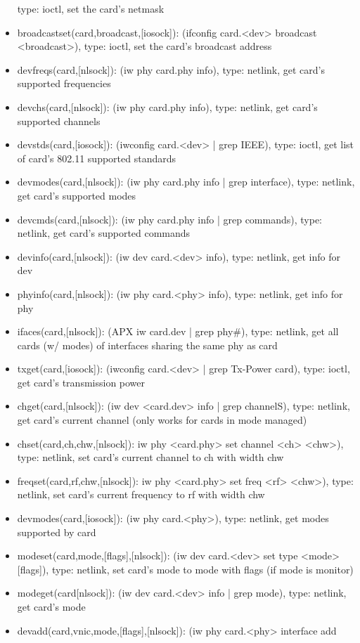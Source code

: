 \documentclass[11pt]{article}
\begin{document}
\begin{appendices}
\begin{itemize}
type: ioctl, set the card's netmask
\item broadcastset(card,broadcast,[iosock]): (ifconfig card.<dev> broadcast 
<broadcast>), type: ioctl, set the card's broadcast address
\item devfreqs(card,[nlsock]): (iw phy card.phy info), type: netlink, get card's 
supported frequencies
\item devchs(card,[nlsock]): (iw phy card.phy info), type: netlink, get card's 
supported channels
\item devstds(card,[iosock]): (iwconfig card.<dev> | grep IEEE), type: ioctl, get
list of card's 802.11 supported standards
\item devmodes(card,[nlsock]): (iw phy card.phy info | grep interface), type:
netlink, get card's supported modes
\item devcmds(card,[nlsock]): (iw phy card.phy info | grep commands), type:
netlink, get card's supported commands
\item devinfo(card,[nlsock]): (iw dev card.<dev> info), type: netlink, get info 
for dev 
\item phyinfo(card,[nlsock]): (iw phy card.<phy> info), type: netlink, get info
for phy
\item ifaces(card,[nlsock]): (APX iw card.dev | grep phy\#), type: netlink, get all
cards (w/ modes) of interfaces sharing the same phy as card
\item txget(card,[iosock]): (iwconfig card.<dev> | grep Tx-Power card), type: 
ioctl, get card's transmission power
\item chget(card,[nlsock]): (iw dev <card.dev> info | grep channelS), type: 
netlink, get card's current channel (only works for cards in mode managed)
\item chset(card,ch,chw,[nlsock]): iw phy <card.phy> set channel <ch> <chw>), 
type: netlink, set card's current channel to ch with width chw
\item freqset(card,rf,chw,[nlsock]): iw phy <card.phy> set freq <rf> <chw>), 
type: netlink, set card's current frequency to rf with width chw
\item devmodes(card,[iosock]): (iw phy card.<phy>), type: netlink, get modes 
supported by card
\item modeset(card,mode,[flags],[nlsock]): (iw dev card.<dev> set type <mode> 
[flags]), type: netlink, set card's mode to mode with flags (if mode is monitor)
\item modeget(card[nlsock]): (iw dev card.<dev> info | grep mode), type: netlink,
get card's mode
\item devadd(card,vnic,mode,[flags],[nlsock]): (iw phy card.<phy> interface add

\end{itemize}
\end{appendices}
\end{document}
